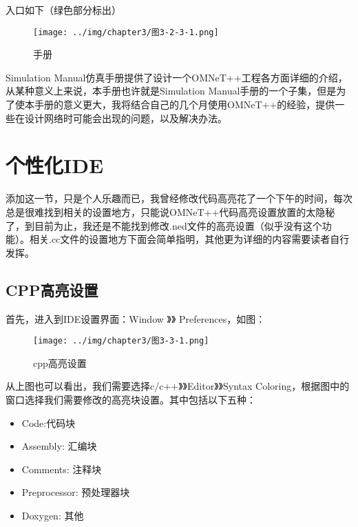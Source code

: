 入口如下（绿色部分标出）

\begin{figure}[htbp]
\centering
\texttt{[image: ../img/chapter3/图3-2-3-1.png]}
\caption{手册}
\end{figure}

Simulation Manual仿真手册提供了设计一个OMNeT++工程各方面详细的介绍，从某种意义上来说，本手册也许就是Simulation Manual手册的一个子集，但是为了使本手册的意义更大，我将结合自己的几个月使用OMNeT++的经验，提供一些在设计网络时可能会出现的问题，以及解决办法。

\section{个性化IDE}
\label{个性化ide}

添加这一节，只是个人乐趣而已，我曾经修改代码高亮花了一个下午的时间，每次总是很难找到相关的设置地方，只能说OMNeT++代码高亮设置放置的太隐秘了，到目前为止，我还是不能找到修改.ned文件的高亮设置（似乎没有这个功能）。相关.cc文件的设置地方下面会简单指明，其他更为详细的内容需要读者自行发挥。

\subsection{CPP高亮设置}
\label{cpp高亮设置}

首先，进入到IDE设置界面：Window 》》 Preferences，如图：

\begin{figure}[htbp]
\centering
\texttt{[image: ../img/chapter3/图3-3-1.png]}
\caption{cpp高亮设置}
\end{figure}

从上图也可以看出，我们需要选择c\slash c++》》Editor》》Syntax Coloring，根据图中的窗口选择我们需要修改的高亮块设置。其中包括以下五种：

\begin{itemize}
\item Code:代码块

\item Assembly: 汇编块

\item Comments: 注释块

\item Preprocessor: 预处理器块

\item Doxygen: 其他

\end{itemize}

